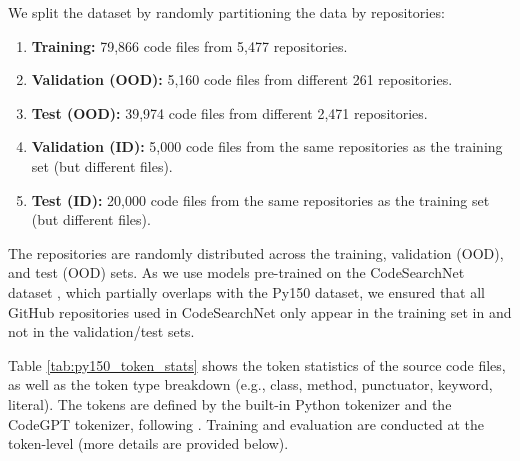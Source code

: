 We split the dataset by randomly partitioning the data by repositories:
\begin{enumerate}
  \item \textbf{Training:} 79,866 code files from 5,477 repositories.
  \item \textbf{Validation (OOD):} 5,160 code files from different 261 repositories.
  \item \textbf{Test (OOD):} 39,974 code files from different 2,471 repositories.
  \item \textbf{Validation (ID):} 5,000 code files from the same repositories as the training set (but different files).
  \item \textbf{Test (ID):} 20,000 code files from the same repositories as the training set (but different files).
\end{enumerate}
The repositories are randomly distributed across the training, validation (OOD), and test (OOD) sets.
As we use models pre-trained on the CodeSearchNet dataset \citep{husain2019codesearchnet}, which partially overlaps with the Py150 dataset, we ensured that all GitHub repositories used in CodeSearchNet only appear in the training set in \Py and not in the validation/test sets.

Table \ref{tab:py150_token_stats} shows the token statistics of the source code files, as well as the token type breakdown (e.g., class, method, punctuator, keyword, literal).
The tokens are defined by the built-in Python tokenizer and the CodeGPT tokenizer, following \citet{CodeXGLUE}.
Training and evaluation are conducted at the token-level (more details are provided below).

\begin{table}[tbp]
    \caption{Token statistics for \Py.}\label{tab:py150_token_stats}
  \centering
\end{table}

